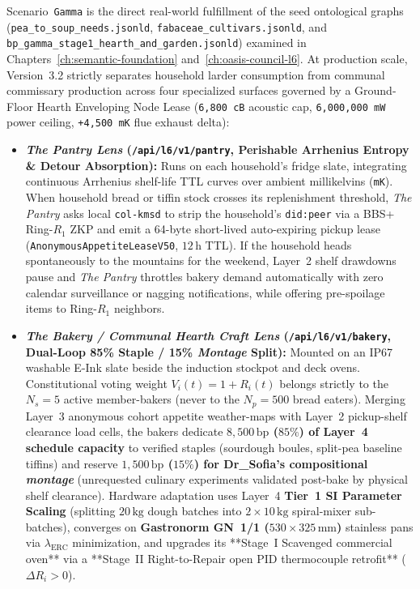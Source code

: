 Scenario~\texttt{Gamma} is the direct real-world fulfillment of the seed ontological graphs (\texttt{pea\_to\_soup\_needs.jsonld}, \texttt{fabaceae\_cultivars.jsonld}, and \texttt{bp\_gamma\_stage1\_hearth\_and\_garden.jsonld}) examined in Chapters~\ref{ch:semantic-foundation} and~\ref{ch:oasis-council-l6}. At production scale, Version~3.2 strictly separates household larder consumption from communal commissary production across four specialized surfaces governed by a Ground-Floor Hearth Enveloping Node Lease (\texttt{6,800 cB} acoustic cap, \texttt{6,000,000 mW} power ceiling, \texttt{+4,500 mK} flue exhaust delta):
\begin{itemize}
    \item \textbf{\textit{The Pantry Lens} (\texttt{/api/l6/v1/pantry}, Perishable Arrhenius Entropy \& Detour Absorption):} Runs on each household's fridge slate, integrating continuous Arrhenius shelf-life TTL curves over ambient millikelvins (\texttt{mK}). When household bread or tiffin stock crosses its replenishment threshold, \textit{The Pantry} asks local \texttt{col-kmsd} to strip the household's \texttt{did:peer} via a BBS+ Ring-$R_1$ ZKP and emit a 64-byte short-lived auto-expiring pickup lease (\texttt{AnonymousAppetiteLeaseV50}, $12\,\mathrm{h}$ TTL). If the household heads spontaneously to the mountains for the weekend, Layer~2 shelf drawdowns pause and \textit{The Pantry} throttles bakery demand automatically with zero calendar surveillance or nagging notifications, while offering pre-spoilage items to Ring-$R_1$ neighbors.
    \item \textbf{\textit{The Bakery / Communal Hearth Craft Lens} (\texttt{/api/l6/v1/bakery}, Dual-Loop 85\% Staple / 15\% \textit{Montage} Split):} Mounted on an IP67 washable E-Ink slate beside the induction stockpot and deck ovens. Constitutional voting weight $V_i(t) = 1 + R_i(t)$ belongs strictly to the $N_s = 5$ active member-bakers (never to the $N_p = 500$ bread eaters). Merging Layer~3 anonymous cohort appetite weather-maps with Layer~2 pickup-shelf clearance load cells, the bakers dedicate \textbf{$8{,}500\,\mathrm{bp}$ ($85\%$) of Layer~4 schedule capacity} to verified staples (sourdough boules, split-pea baseline tiffins) and reserve \textbf{$1{,}500\,\mathrm{bp}$ ($15\%$) for Dr\_Sofia's compositional \textit{montage}} (unrequested culinary experiments validated post-bake by physical shelf clearance). Hardware adaptation uses Layer~4 \textbf{Tier~1 SI Parameter Scaling} (splitting $20\,\mathrm{kg}$ dough batches into $2 \times 10\,\mathrm{kg}$ spiral-mixer sub-batches), converges on \textbf{Gastronorm GN~1/1 ($530 \times 325\,\mathrm{mm}$)} stainless pans via $\lambda_{\mathrm{ERC}}$ minimization, and upgrades its **Stage~I Scavenged commercial oven** via a **Stage~II Right-to-Repair open PID thermocouple retrofit** ($\Delta R_i > 0$).

\end{itemize}
